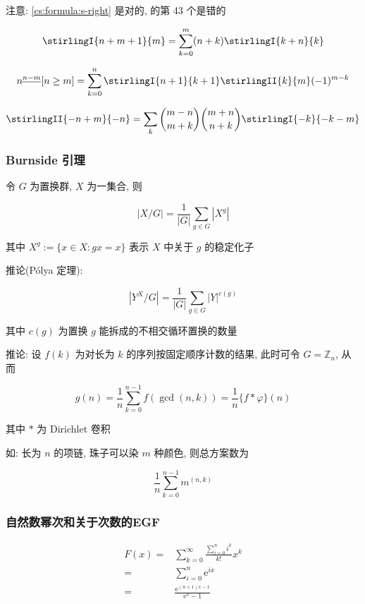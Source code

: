 注意: \eqref{cs:formula:s-right} 是对的,  的第 43 个是错的

\begin{equation}
    \label{cs:formula:s-right}
    \stirlingI{n+m+1}{m}=\sum_{k=0}^m(n+k)\stirlingI{k+n}{k}
\end{equation}

\begin{equation}
    n^{\underline{n-m}}[n\geq m]=\sum_{k=0}^n\stirlingI{n+1}{k+1}\stirlingII{k}{m}(-1)^{m-k}
\end{equation}

\begin{equation}
    \stirlingII{-n+m}{-n}=\sum_k\binom{m-n}{m+k}\binom{m+n}{n+k}\stirlingI{-k}{-k-m}
\end{equation}

\subsubsection{Burnside 引理}

令 \(G\) 为置换群, \(X\) 为一集合, 则

\[
    |X/G|=\frac{1}{|G|}\sum_{g\in G}\left|X^g\right|
\]

其中 \(X^g:=\{x\in X:gx=x\}\) 表示 \(X\) 中关于 \(g\) 的稳定化子

推论(P\'olya 定理):

\[
    \left|Y^X/G\right|=\frac{1}{|G|}\sum_{g\in G} |Y|^{c(g)}
\]

其中 \(c(g)\) 为置换 \(g\) 能拆成的不相交循环置换的数量

推论: 设 \(f(k)\) 为对长为 \(k\) 的序列按固定顺序计数的结果, 此时可令 \(G=\mathbb{Z}_n\), 从而

\[
    g(n)=\frac{1}{n}\sum_{k=0}^{n-1}f(\gcd(n,k))=\frac{1}{n} \{f*\varphi\}(n)
\]

其中 \(*\) 为 Dirichlet 卷积

如: 长为 \(n\) 的项链, 珠子可以染 \(m\) 种颜色, 则总方案数为

\[
    \frac{1}{n}\sum_{k=0}^{n-1} m^{(n,k)}
\]

\subsubsection{自然数幂次和关于次数的EGF}

\begin{equation}
    \begin{aligned} 
        F(x)= & \sum_{k=0}^\infty \frac{\sum_{i=0}^n i^k}{k!}x^k \\ 
        =     & \sum_{i=0}^n \mathrm{e}^{ix}                     \\
        =     & \frac{\mathrm{e}^{(n+1)x-1}}{\mathrm{e}^x-1}
    \end{aligned}
\end{equation}


